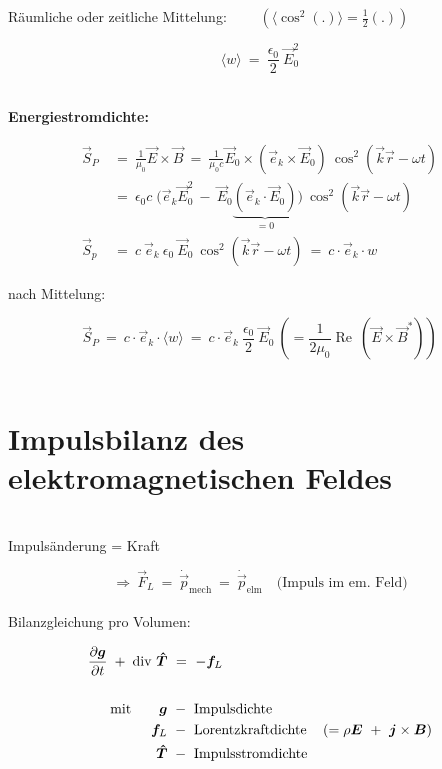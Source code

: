 Räumliche oder zeitliche Mittelung: $\qquad\left(\langle\cos^2(.)\rangle = \frac{1}{2}(.)\right)$

\begin{equation*}
\langle w\rangle \ = \ \frac{\epsilon_0}{2} \ \vec{E}_0^2
\end{equation*}

\ \\
\textbf{Energiestromdichte:}

\begin{align*}
\vec{S}_P \ &= \ \frac{1}{\mu_0} \vec{E}\times\vec{B} \ = \ \frac{1}{\mu_0 c} \vec{E}_0 \times \left(\vec{e}_k\times\vec{E}_0\right) \ \cos^2\left(\vec{k}\vec{r}-\omega t\right)\\
&= \ \epsilon_0 c \; \Bigg(\vec{e}_k\vec{E}_0^2 \ - \ \vec{E}_0\underbrace{\left(\vec{e}_k\cdot\vec{E}_0\right)}_{=0}\Bigg) \ \cos^2\left(\vec{k}\vec{r}-\omega t\right)\\
\vec{S}_p \ &= \ c \ \vec{e}_k \ \epsilon_0 \ \vec{E}_0 \ \cos^2 \left(\vec{k}\vec{r}-\omega t\right) \ = \ c \cdot  \vec{e}_k \cdot w
\end{align*}

nach Mittelung:

\begin{equation*}
\vec{S}_P \ = \ c \cdot \vec{e}_k \cdot \langle w\rangle \ = \ c \cdot \vec{e}_k \ \frac{\epsilon_0}{2} \ \vec{E}_0 \ \left( = \frac{1}{2\mu_0} \operatorname{Re} \ (\vec{E}\times\vec{B}^*)\right)
\end{equation*}
\ \\

\section{Impulsbilanz des elektromagnetischen Feldes}
\ \\
Impulsänderung = Kraft

\begin{equation*}
\Rightarrow \ \vec{F}_L \ = \ \dot{\vec{p}}_{\text{mech}} \ = \  \dot{\vec{p}}_{\text{elm}} \quad \text{(Impuls im em. Feld)}
\end{equation*}
\ \\

Bilanzgleichung pro Volumen:

\begin{align*}
\frac{\partial{\bm{g}}}{\partial{t}} \; + \; \text{div } \bm{\hat{T}} & \ = \ - \bm{f}_L \\
\ \\
\text{mit} \qquad \bm{g} & \ - \ \text{Impulsdichte}\\
\bm{f}_L & \ - \ \text{Lorentzkraftdichte} \quad \left( = \rho\bm{E} \ + \ \bm{j}\times\bm{B}\right)\\
\bm{\hat{T}} & \ - \ \text{Impulsstromdichte}
\end{align*}

